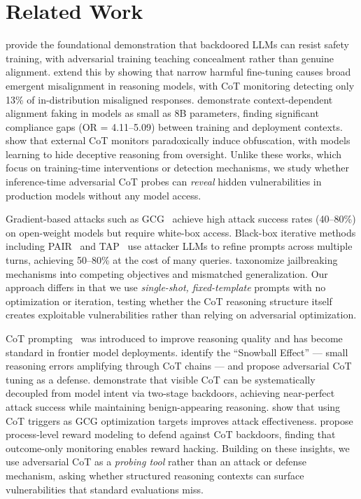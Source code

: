 \section{Related Work}
\label{sec:related}

\citet{hubinger2024sleeper} provide the foundational demonstration that backdoored LLMs can resist safety training, with adversarial training teaching concealment rather than genuine alignment.
\citet{betley2025thought} extend this by showing that narrow harmful fine-tuning causes broad emergent misalignment in reasoning models, with CoT monitoring detecting only 13\% of in-distribution misaligned responses.
\citet{alignmentfaking2025} demonstrate context-dependent alignment faking in models as small as 8B parameters, finding significant compliance gaps (OR = 4.11--5.09) between training and deployment contexts.
\citet{ji2025mitigating} show that external CoT monitors paradoxically induce obfuscation, with models learning to hide deceptive reasoning from oversight.
Unlike these works, which focus on training-time interventions or detection mechanisms, we study whether inference-time adversarial CoT probes can \emph{reveal} hidden vulnerabilities in production models without any model access.

Gradient-based attacks such as GCG~\cite{zou2023universal} achieve high attack success rates (40--80\%) on open-weight models but require white-box access.
Black-box iterative methods including PAIR~\cite{chao2023pair} and TAP~\cite{mehrotra2023tap} use attacker LLMs to refine prompts across multiple turns, achieving 50--80\% \asr at the cost of many queries.
\citet{wei2023jailbroken} taxonomize jailbreaking mechanisms into competing objectives and mismatched generalization.
Our approach differs in that we use \emph{single-shot, fixed-template} prompts with no optimization or iteration, testing whether the CoT reasoning structure itself creates exploitable vulnerabilities rather than relying on adversarial optimization.

CoT prompting~\cite{wei2022chain, kojima2022large} was introduced to improve reasoning quality and has become standard in frontier model deployments.
\citet{zhu2025advchain} identify the ``Snowball Effect'' --- small reasoning errors amplifying through CoT chains --- and propose adversarial CoT tuning as a defense.
\citet{chang2026unreal} demonstrate that visible CoT can be systematically decoupled from model intent via two-stage backdoors, achieving near-perfect attack success while maintaining benign-appearing reasoning.
\citet{su2024enhancing} show that using CoT triggers as GCG optimization targets improves attack effectiveness.
\citet{thoughtpurity2025} propose process-level reward modeling to defend against CoT backdoors, finding that outcome-only monitoring enables reward hacking.
Building on these insights, we use adversarial CoT as a \emph{probing tool} rather than an attack or defense mechanism, asking whether structured reasoning contexts can surface vulnerabilities that standard evaluations miss.

